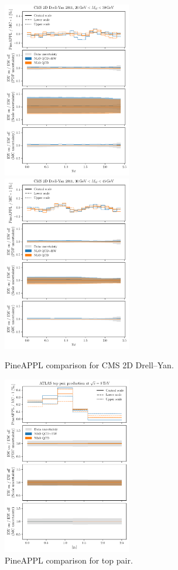 \begin{figure}
    \centering
    \includegraphics[width=0.5\textwidth]{figures/pineappl_CMSDY2D11_bin1}%
    \includegraphics[width=0.5\textwidth]{figures/pineappl_CMSDY2D11_bin2}
    \caption{PineAPPL comparison for CMS 2D Drell--Yan.}
    \label{fig:cmsdy2d11_bins12}
\end{figure}

\begin{figure}
    \centering
    \includegraphics[width=0.5\textwidth]{figures/pineappl_ATLAS_TTB_DIFF_8TEV_LJ_TRAP}%
    \caption{PineAPPL comparison for top pair.}
    \label{fig:cmsdy2d11_bins56}
\end{figure}
